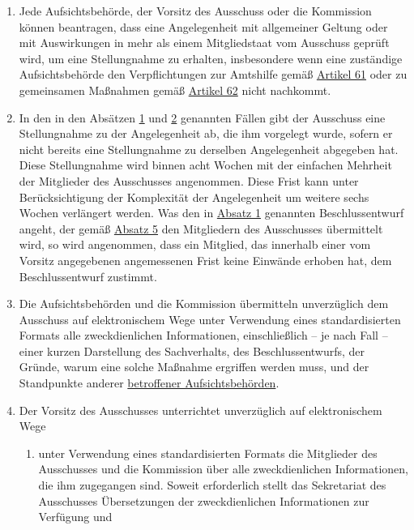 \begin{enumerate}
  \item Jede Aufsichtsbehörde, der Vorsitz des Ausschuss oder die Kommission können beantragen, dass eine Angelegenheit
   mit allgemeiner Geltung oder mit Auswirkungen in mehr als einem Mitgliedstaat vom Ausschuss geprüft wird, um eine
   Stellungnahme zu erhalten, insbesondere wenn eine zuständige Aufsichtsbehörde den Verpflichtungen zur Amtshilfe
   gemäß \hyperref[ch:61]{Artikel 61} oder zu gemeinsamen Maßnahmen gemäß \hyperref[ch:62]{Artikel 62} nicht nachkommt.
  \label{itm:64-2}

  \item In den in den Absätzen \hyperref[itm:64-1]{1} und \hyperref[itm:64-2]{2} genannten Fällen gibt der Ausschuss
   eine Stellungnahme zu der Angelegenheit ab, die ihm vorgelegt wurde, sofern er nicht bereits eine Stellungnahme zu
   derselben Angelegenheit abgegeben hat. Diese Stellungnahme wird binnen acht Wochen mit der einfachen Mehrheit der
   Mitglieder des Ausschusses angenommen. Diese Frist kann unter Berücksichtigung der Komplexität der Angelegenheit um
   weitere sechs Wochen verlängert werden. Was den in \hyperref[itm:64-1]{Absatz 1} genannten Beschlussentwurf angeht,
   der gemäß \hyperref[itm:64-5]{Absatz 5} den Mitgliedern des Ausschusses übermittelt wird, so wird angenommen, dass
   ein Mitglied, das innerhalb einer vom Vorsitz angegebenen angemessenen Frist keine Einwände erhoben hat, dem
   Beschlussentwurf zustimmt.
  \label{itm:64-3}

  \item Die Aufsichtsbehörden und die Kommission übermitteln unverzüglich dem Ausschuss auf elektronischem Wege unter
   Verwendung eines standardisierten Formats alle zweckdienlichen Informationen, einschließlich -- je nach Fall --
   einer kurzen Darstellung des Sachverhalts, des Beschlussentwurfs, der Gründe, warum eine solche Maßnahme ergriffen
   werden muss, und der Standpunkte anderer \hyperref[itm:04-22]{betroffener Aufsichtsbehörden}.
  \label{itm:64-4}

  \item Der Vorsitz des Ausschusses unterrichtet unverzüglich auf elektronischem Wege
  \label{itm:64-5}

  \begin{enumerate}
  
    \item unter Verwendung eines standardisierten Formats die Mitglieder des Ausschusses und die Kommission über alle
     zweckdienlichen Informationen, die ihm zugegangen sind. Soweit erforderlich stellt das Sekretariat des Ausschusses
     Übersetzungen der zweckdienlichen Informationen zur Verfügung und
    \label{itm:64-5a}


\end{enumerate}
\end{enumerate}
